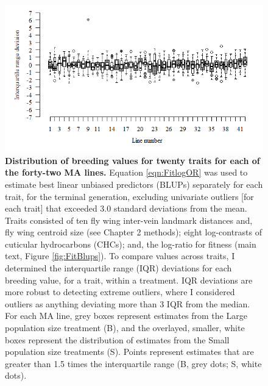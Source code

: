 \FloatBarrier
\begin{figure}[!hb]
    \centering
    \includegraphics[width=1\textwidth]{Supp/Chp4_DNA/MultiBreedingVals.png}
\caption[Distribution of breeding values for twenty traits for each of the forty-two MA lines. ]{\textbf{Distribution of breeding values for twenty traits for each of the forty-two MA lines.} Equation \ref{eqn:FitlogOR} was used to estimate best linear unbiased predictors (BLUPs) separately for each trait, for the terminal generation, excluding univariate outliers [for each trait] that exceeded 3.0 standard deviations from the mean. Traits consisted of ten fly wing inter-vein landmark distances and, fly wing centroid size (see Chapter 2 methods); eight log-contrasts of cuticular hydrocarbons (CHCs); and, the log-ratio for fitness (main text, Figure \ref{fig:FitBlups}). To compare values across traits, I determined the interquartile range (IQR) deviations for each breeding value, for a trait, within a treatment. IQR deviations are more robust to detecting extreme outliers, where I considered outliers as anything deviating more than 3 IQR from the median. For each MA line, grey boxes represent estimates from the Large population size treatment (B), and the overlayed, smaller, white boxes represent the distribution of estimates from the Small population size treatments (S). Points represent estimates that are greater than 1.5 times the interquartile range (B, grey dots; S, white dots). }
    \label{fig:DNAsuppBlups}
\end{figure}

\FloatBarrier

